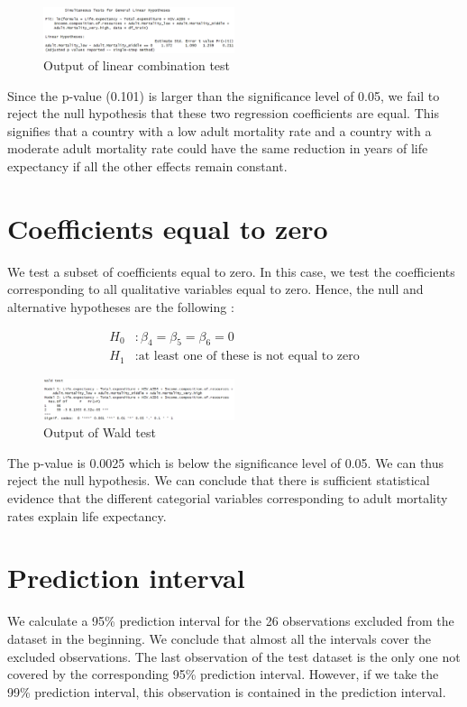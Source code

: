 \begin{figure}[H]
	\centering
	\includegraphics[width=0.5\textwidth]{figures/hypothesis_testing/linear_combination_of_coeff_homoskedasticity.PNG}
	\caption{Output of linear combination test}
\end{figure}

Since the p-value (0.101) is larger than the significance level of 0.05, we fail to reject the null hypothesis that these two regression coefficients are equal. This signifies that a country with a low adult mortality rate and a country with a moderate adult mortality rate could have the same reduction in years of life expectancy if all the other effects remain constant. 

\section{Coefficients equal to zero}

We test a subset of coefficients equal to zero. In this case, we test the coefficients corresponding to all qualitative variables equal to zero. Hence, the null and alternative hypotheses are the following :

\begin{align*}
	H_0&: \beta_4 = \beta_5 = \beta_6 = 0 \\
	H_1&: \text{at least one of these is not equal to zero}
\end{align*}

\begin{figure}[H]
	\centering
	\includegraphics[width=0.5\textwidth]{figures/hypothesis_testing/wald_test_subset_coeff_zero_homoskedasticity.PNG}
	\caption{Output of Wald test}
\end{figure}

The p-value is 0.0025 which is below the significance level of 0.05. We can thus reject the null hypothesis. We can conclude that there is sufficient statistical evidence that the different categorial variables corresponding to adult mortality rates explain life expectancy. 

\section{Prediction interval}

We calculate a 95\% prediction interval for the 26 observations excluded from the dataset in the beginning. We conclude that almost all the intervals cover the excluded observations. The last observation of the test dataset is the only one not covered by the corresponding 95\% prediction interval. However, if we take the 99\% prediction interval, this observation is contained in the prediction interval.
